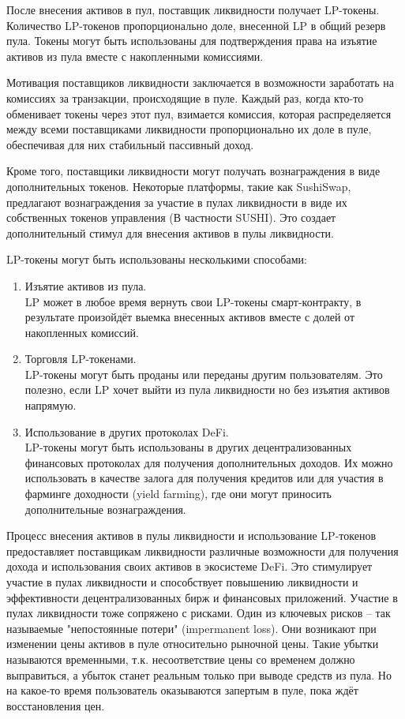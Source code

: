 После внесения активов в пул, поставщик ликвидности получает LP-токены. Количество LP-токенов пропорционально доле, внесенной LP в общий резерв пула. Токены могут быть использованы для подтверждения права на изъятие активов из пула вместе с накопленными комиссиями.

Мотивация поставщиков ликвидности заключается в возможности заработать на комиссиях за транзакции, происходящие в пуле. Каждый раз, когда кто-то обменивает токены через этот пул, взимается комиссия, которая распределяется между всеми поставщиками ликвидности пропорционально их доле в пуле, обеспечивая для них стабильный пассивный доход.

Кроме того, поставщики ликвидности могут получать вознаграждения в виде дополнительных токенов. Некоторые платформы, такие как SushiSwap, предлагают вознаграждения за участие в пулах ликвидности в виде их собственных токенов управления (В частности SUSHI). Это создает дополнительный стимул для внесения активов в пулы ликвидности.

LP-токены могут быть использованы несколькими способами:
\begin{enumerate}
\item Изъятие активов из пула.\\
LP может в любое время вернуть свои LP-токены смарт-контракту, в результате произойдёт выемка внесенных активов вместе с долей от накопленных комиссий.
\item Торговля LP-токенами.\\
LP-токены могут быть проданы или переданы другим пользователям. Это полезно, если LP хочет выйти из пула ликвидности но без изъятия активов напрямую.
\item Использование в других протоколах DeFi.\\
LP-токены могут быть использованы в других децентрализованных финансовых протоколах для получения дополнительных доходов. Их можно использовать в качестве залога для получения кредитов или для участия в фарминге доходности (yield farming), где они могут приносить дополнительные вознаграждения.
\end{enumerate}

Процесс внесения активов в пулы ликвидности и использование LP-токенов предоставляет поставщикам ликвидности различные возможности для получения дохода и использования своих активов в экосистеме DeFi. Это стимулирует участие в пулах ликвидности и способствует повышению ликвидности и эффективности децентрализованных бирж и финансовых приложений. Участие в пулах ликвидности тоже сопряжено с рисками. Один из ключевых рисков -- так называемые "непостоянные потери" (impermanent loss). Они возникают при изменении цены активов в пуле относительно рыночной цены. Такие убытки называются временными, т.к. несоответствие цены со временем должно выправиться, а убыток станет реальным только при выводе средств из пула. Но на какое-то время пользователь оказываются запертым в пуле, пока ждёт восстановления цен.

